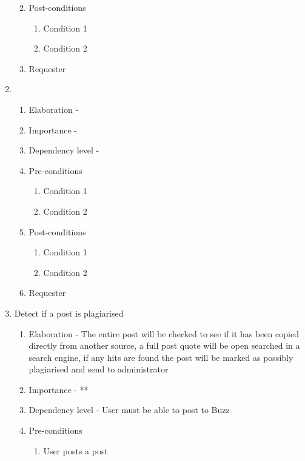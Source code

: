 \documentclass[12pt]{article}
\begin{document}
\begin{enumerate}
\begin{enumerate}
\begin{enumerate}
    \end{enumerate}
        \item Post-conditions
    \begin{enumerate}
    	\item Condition 1
    	\item Condition 2
    \end{enumerate}
    \item Requester
  \end{enumerate}
\clearpage %
   \item  %
  \begin{enumerate}
    \item Elaboration - 
    \item Importance - 
    \item Dependency level - 
    \item Pre-conditions
    \begin{enumerate}
    	\item Condition 1
    	\item Condition 2
    \end{enumerate}
        \item Post-conditions
    \begin{enumerate}
    	\item Condition 1
    	\item Condition 2
    \end{enumerate}
    \item Requester
  \end{enumerate}
\clearpage %
   \item Detect if a post is plagiarised  %
  \begin{enumerate}
    \item Elaboration - The entire post will be checked to see if it has been copied directly from another source, a full post quote will be open searched in a search engine, if any hits are found the post will be marked as possibly plagiarised and send to administrator
    \item Importance - **
    \item Dependency level - User must be able to post to Buzz
    \item Pre-conditions
    \begin{enumerate}
    	\item User posts a post

\end{enumerate}
\end{enumerate}
\end{enumerate}
\end{document}

